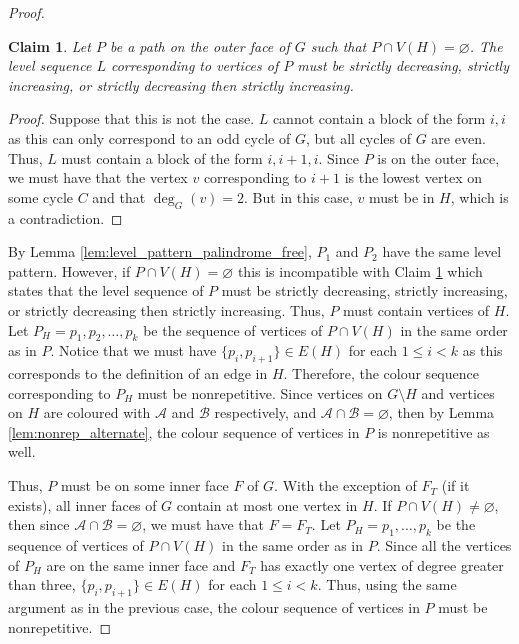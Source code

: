 \documentclass{patmorin}
\let\emptyset\varnothing
\newtheorem{claim}{Claim}[theorem]
\begin{document}
\begin{proof}
 \begin{claim}
  Let $P$ be a path on the outer face of $G$ such that $P \cap V(H) = \emptyset$. The level sequence $L$ corresponding to vertices of $P$ must be strictly decreasing, strictly increasing, or strictly decreasing then strictly increasing.
  \label{claim:strictly_inc_dec}
 \end{claim}
 \begin{proof}
 Suppose that this is not the case. $L$ cannot contain a block of the form $i,i$ as this can only correspond to an odd cycle of $G$, but all cycles of $G$ are even. Thus, $L$ must contain a block of the form $i,i+1,i$. Since $P$ is on the outer face, we must have that the vertex $v$ corresponding to $i+1$ is the lowest vertex on some cycle $C$ and that $\deg_G(v)=2$. But in this case, $v$ must be in $H$, which is a contradiction. 
 \end{proof}
 By Lemma \ref{lem:level_pattern_palindrome_free}, $P_1$ and $P_2$ have the same level pattern. However, if $P \cap V(H) = \emptyset$ this is incompatible with Claim \ref{claim:strictly_inc_dec} which states that the level sequence of $P$ must be strictly decreasing, strictly increasing, or strictly decreasing then strictly increasing.  Thus, $P$ must contain vertices of $H$. Let $P_H=p_1,p_2,\ldots,p_k$ be the sequence of vertices of $P \cap V(H)$ in the same order as in $P$. Notice that we must have $\{p_i,p_{i+1}\}\in E(H)$ for each $1 \leq i < k$ as this corresponds to the definition of an edge in $H$. Therefore, the colour sequence corresponding to $P_H$ must be nonrepetitive. Since vertices on $G\setminus{H}$ and vertices on $H$ are coloured with $\mathcal{A}$ and $\mathcal{B}$ respectively, and $\mathcal{A} \cap \mathcal{B} = \emptyset$, then by Lemma \ref{lem:nonrep_alternate}, the colour sequence of vertices in $P$ is nonrepetitive as well. 
 
 Thus, $P$ must be on some inner face $F$ of $G$. With the exception of $F_T$ (if it exists), all inner faces of $G$ contain at most one vertex in $H$. If $P\cap V(H) \not= \emptyset$, then since $\mathcal{A} \cap \mathcal{B} = \emptyset$, we must have that $F=F_T$. Let $P_H=p_1,\ldots,p_k$ be the sequence of vertices of $P \cap V(H)$ in the same order as in $P$. Since all the vertices of $P_H$ are on the same inner face and $F_T$ has exactly one vertex of degree greater than three, $\{p_i,p_{i+1}\}\in E(H)$ for each $1 \leq i < k$. Thus, using the same argument as in the previous case, the colour sequence of vertices in $P$ must be nonrepetitive. 
 

\end{proof}
\end{document}
